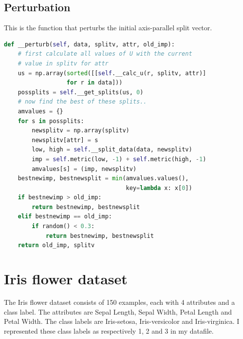 \documentclass[12pt]{article}
\begin{document}
\subsection{Perturbation}
This is the function that perturbs the initial axis-parallel split vector.
\begin{lstlisting}[language=Python]
def __perturb(self, data, splitv, attr, old_imp):
    # first calculate all values of U with the current 
    # value in splitv for attr
    us = np.array(sorted([[self.__calc_u(r, splitv, attr)]
                  for r in data]))
    possplits = self.__get_splits(us, 0)
    # now find the best of these splits..
    amvalues = {}
    for s in possplits:
        newsplitv = np.array(splitv)
        newsplitv[attr] = s
        low, high = self.__split_data(data, newsplitv)
        imp = self.metric(low, -1) + self.metric(high, -1)
        amvalues[s] = (imp, newsplitv)
    bestnewimp, bestnewsplit = min(amvalues.values(), 
                                   key=lambda x: x[0])
    if bestnewimp > old_imp:
        return bestnewimp, bestnewsplit
    elif bestnewimp == old_imp:
        if random() < 0.3:
            return bestnewimp, bestnewsplit
    return old_imp, splitv
\end{lstlisting}

\section{Iris flower dataset}
The Iris flower dataset consists of 150 examples, each with 4 attributes and a class label. The attributes are Sepal Length, Sepal Width, Petal Length and Petal Width. The class labels are Iris-setosa, Iris-versicolor and Iris-virginica. I represented these class labels as respectively 1, 2 and 3 in my datafile.
\end{document}
